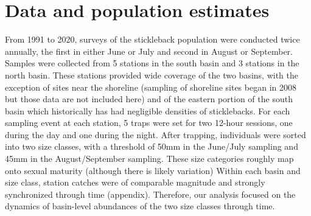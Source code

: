 
\section*{Data and population estimates} \label{data}


From 1991 to 2020, surveys of the stickleback population were conducted twice annually, 
the first in either June or July and second in August or September. 
Samples were collected from 5 stations in the south basin and 3 stations in the north basin.
These stations provided wide coverage of the two basins, 
with the exception of sites near the shoreline 
(sampling of shoreline sites began in 2008 but those data are not included here)
and of the eastern portion of the south basin which historically has had negligible 
densities of sticklebacks.
For each sampling event at each station, 
5 traps were set for two 12-hour sessions, 
one during the day and one during the night.
After trapping, individuals were sorted into two size classes,
with a threshold of 50mm in the June/July sampling and 45mm in the August/September sampling.
These size categories roughly map onto sexual maturity (although there is likely variation)
Within each basin and size class, 
station catches were of comparable magnitude and 
strongly synchronized through time (appendix).
Therefore, our analysis focused on the dynamics of basin-level abundances
of the two size classes through time.

